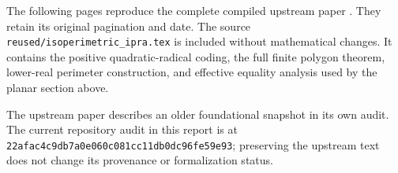 \documentclass[11pt,a4paper]{article}
\theoremstyle{definition}
\begin{document}
The following pages reproduce the complete compiled upstream paper
\cite{prior-planar}. They retain its original pagination and date.
The source \texttt{reused/isoperimetric\_ipra.tex} is included without
mathematical changes. It contains the positive quadratic-radical coding,
the full finite polygon theorem, lower-real perimeter construction,
and effective equality analysis used by the planar section above.

The upstream paper describes an older foundational snapshot in its own
audit. The current repository audit in this report is at
\texttt{22afac4c9db7a0e060c081cc11db0dc96fe59e93}; preserving the
upstream text does not change its provenance or formalization status.


\end{document}
